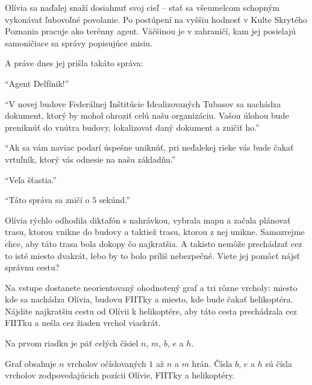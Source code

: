 





Olívia sa naďalej snaží dosiahnuť svoj cieľ -- stať sa všeumelcom schopným vykonávať ľubovoľné
povolanie. Po postúpení na vyššiu hodnosť v Kulte Skrytého Poznania pracuje ako terénny agent.
Väčšinou je v zahraničí, kam jej posielajú samoničiace sa správy popisujúce misiu.

A práve dnes jej prišla takáto správa:

\bigskip

``Agent Delfínik!''

``V novej budove Federálnej Inštitúcie Idealizovaných Tubasov sa nachádza dokument, ktorý by mohol ohroziť
celú našu organizáciu. Vašou úlohou bude preniknúť do vnútra budovy, lokalizovať daný dokument a
zničiť ho.''

``Ak sa vám naviac podarí úspešne uniknúť, pri neďalekej rieke vás bude čakať vrtuľník, ktorý vás
odnesie na našu základňu.''

``Veľa šťastia.''

``Táto správa sa zničí o $5$ sekúnd.''

\bigskip

Olívia rýchlo odhodila diktafón s nahrávkou, vybrala mapu a začala plánovať trasu, ktorou vnikne do
budovy a taktiež trasu, ktorou z nej unikne. Samozrejme chce, aby táto trasa bola dokopy čo
najkratšia. A takisto nemôže prechádzať cez to isté miesto dvakrát, lebo by to bolo príliš
nebezpečné. Viete jej pomôcť nájsť správnu cestu?


Na vstupe dostanete neorientovaný ohodnotený graf a tri rôzne vrcholy: miesto kde sa nachádza
Olívia, budovu FIITky a miesto, kde bude čakať helikoptéra. Nájdite najkratšiu cestu od Olívii k
helikoptére, aby táto cesta prechádzala cez FIITku a nešla cez žiaden vrchol viackrát.


Na prvom riadku je päť celých čísiel $n$, $m$, $b$, $e$ a $h$.

Graf obsahuje $n$ vrcholov očíslovaných $1$ až $n$ a $m$ hrán. Čísla $b$, $e$ a $h$ sú čísla
vrcholov zodpovedajúcich pozícii Olívie, FIITky a helikoptéry.

